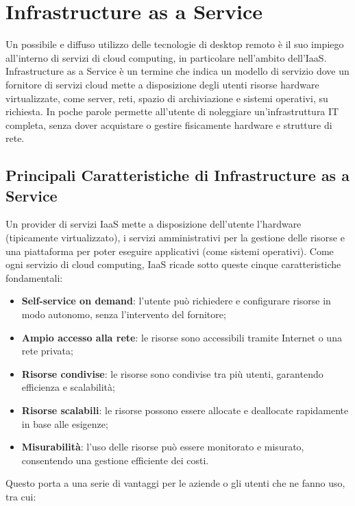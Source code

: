 \documentclass[12pt,a4paper,openright,twoside]{book}
\begin{document}
\section{Infrastructure as a Service}
\label{sec:iaas}
Un possibile e diffuso utilizzo delle tecnologie di desktop remoto è il suo impiego all'interno di servizi di cloud computing, in particolare nell'ambito dell'\ac{IaaS}.
Infrastructure as a Service è un termine che indica un modello di servizio dove un fornitore di servizi cloud mette a disposizione degli utenti risorse hardware virtualizzate, come server, reti, spazio di archiviazione e sistemi operativi, su richiesta. In poche parole permette all'utente di noleggiare un'infrastruttura IT completa, senza dover acquistare o gestire fisicamente hardware e strutture di rete.

\subsection{Principali Caratteristiche di Infrastructure as a Service}
Un provider di servizi \ac{IaaS} mette a disposizione dell'utente l'hardware (tipicamente virtualizzato), i servizi amministrativi per la gestione delle risorse e una piattaforma per poter eseguire applicativi (come sistemi operativi).
Come ogni servizio di cloud computing, \ac{IaaS} ricade sotto queste cinque caratteristiche fondamentali\cite{bhardwaj2010cloud}:
\begin{itemize}
    \item \textbf{Self-service on demand}: l'utente può richiedere e configurare risorse in modo autonomo, senza l'intervento del fornitore;
    \item \textbf{Ampio accesso alla rete}: le risorse sono accessibili tramite Internet o una rete privata;
    \item \textbf{Risorse condivise}: le risorse sono condivise tra più utenti, garantendo efficienza e scalabilità;
    \item \textbf{Risorse scalabili}: le risorse possono essere allocate e deallocate rapidamente in base alle esigenze;
    \item \textbf{Misurabilità}: l'uso delle risorse può essere monitorato e misurato, consentendo una gestione efficiente dei costi.
\end{itemize}
Questo porta a una serie di vantaggi per le aziende o gli utenti che ne fanno uso, tra cui\cite{bhardwaj2010cloud}:
\end{document}
